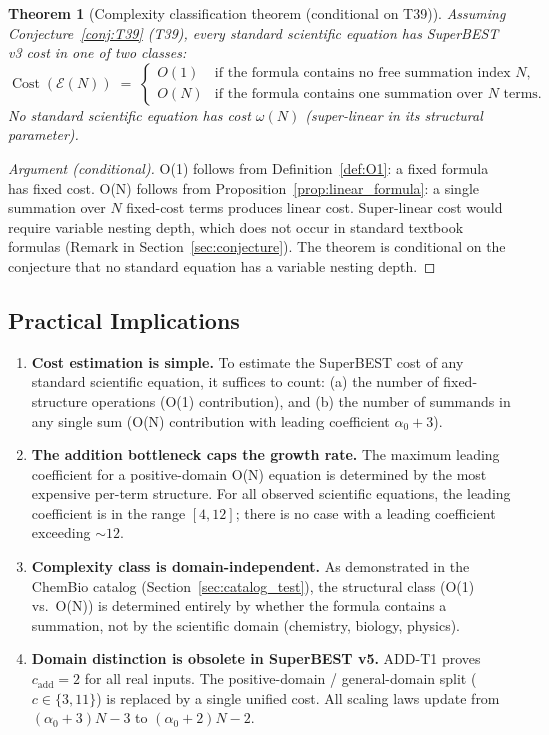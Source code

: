 \documentclass[12pt,a4paper]{article}
\newtheorem{theorem}{Theorem}[section]
\theoremstyle{definition}
\newcommand{\Cost}{\operatorname{Cost}}
\begin{document}
\begin{theorem}[Complexity classification theorem (conditional on T39)]
\label{thm:classification}
Assuming Conjecture~\ref{conj:T39} (T39), every standard scientific
equation has SuperBEST v3 cost in one of two classes:
\[
  \Cost(\mathcal{E}(N)) \;=\;
  \begin{cases}
    O(1) & \text{if the formula contains no free summation index } N, \\
    O(N) & \text{if the formula contains one summation over } N \text{ terms.}
  \end{cases}
\]
No standard scientific equation has cost $\omega(N)$ (super-linear in
its structural parameter).
\end{theorem}

\begin{proof}[Argument (conditional)]
O(1) follows from Definition~\ref{def:O1}: a fixed formula has fixed
cost.  O(N) follows from Proposition~\ref{prop:linear_formula}: a single
summation over $N$ fixed-cost terms produces linear cost.
Super-linear cost would require variable nesting depth, which does not
occur in standard textbook formulas (Remark in Section~\ref{sec:conjecture}).
The theorem is conditional on the conjecture that no standard equation
has a variable nesting depth.
\end{proof}

\subsection{Practical Implications}

\begin{enumerate}
  \item \textbf{Cost estimation is simple.}  To estimate the
        SuperBEST cost of any standard scientific equation, it suffices
        to count: (a) the number of fixed-structure operations (O(1)
        contribution), and (b) the number of summands in any single
        sum (O(N) contribution with leading coefficient $\alpha_0 + 3$).
  \item \textbf{The addition bottleneck caps the growth rate.}
        The maximum leading coefficient for a positive-domain O(N)
        equation is determined by the most expensive per-term structure.
        For all observed scientific equations, the leading coefficient
        is in the range $[4, 12]$; there is no case with a leading
        coefficient exceeding $\sim 12$.
  \item \textbf{Complexity class is domain-independent.}  As
        demonstrated in the ChemBio catalog (Section~\ref{sec:catalog_test}),
        the structural class (O(1) vs.\ O(N)) is determined entirely by
        whether the formula contains a summation, not by the scientific
        domain (chemistry, biology, physics).
  \item \textbf{Domain distinction is obsolete in SuperBEST v5.}
        ADD-T1 proves $c_{\mathrm{add}} = 2$ for all real inputs.
        The positive-domain / general-domain split ($c \in \{3, 11\}$)
        is replaced by a single unified cost.  All scaling laws update
        from $(\alpha_0 + 3)N - 3$ to $(\alpha_0 + 2)N - 2$.
\end{enumerate}
\end{document}
